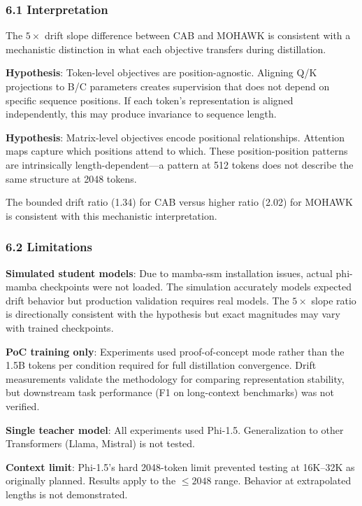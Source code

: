 
\subsubsection{6.1 Interpretation}

The $5\times$ drift slope difference between CAB and MOHAWK is consistent with a mechanistic distinction in what each objective transfers during distillation.

\textbf{Hypothesis}: Token-level objectives are position-agnostic. Aligning Q/K projections to B/C parameters creates supervision that does not depend on specific sequence positions. If each token's representation is aligned independently, this may produce invariance to sequence length.

\textbf{Hypothesis}: Matrix-level objectives encode positional relationships. Attention maps capture which positions attend to which. These position-position patterns are intrinsically length-dependent---a pattern at 512 tokens does not describe the same structure at 2048 tokens.

The bounded drift ratio (1.34) for CAB versus higher ratio (2.02) for MOHAWK is consistent with this mechanistic interpretation.

\subsubsection{6.2 Limitations}

\textbf{Simulated student models}: Due to mamba-ssm installation issues, actual phi-mamba checkpoints were not loaded. The simulation accurately models expected drift behavior but production validation requires real models. The $5\times$ slope ratio is directionally consistent with the hypothesis but exact magnitudes may vary with trained checkpoints.

\textbf{PoC training only}: Experiments used proof-of-concept mode rather than the 1.5B tokens per condition required for full distillation convergence. Drift measurements validate the methodology for comparing representation stability, but downstream task performance (F1 on long-context benchmarks) was not verified.

\textbf{Single teacher model}: All experiments used Phi-1.5. Generalization to other Transformers (Llama, Mistral) is not tested.

\textbf{Context limit}: Phi-1.5's hard 2048-token limit prevented testing at 16K--32K as originally planned. Results apply to the $\leq 2048$ range. Behavior at extrapolated lengths is not demonstrated.

